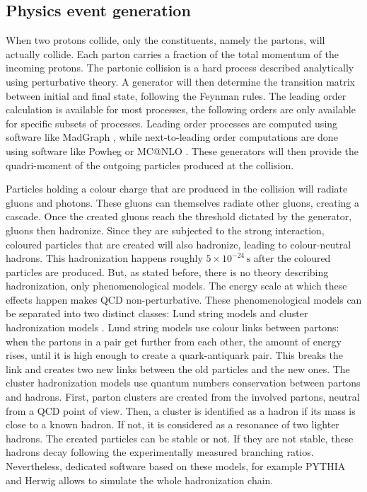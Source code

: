 \subsection{Physics event generation} 
\label{sec:cms_physics_event_generation}

When two protons collide, only the constituents, namely the partons, will actually collide. Each parton carries a fraction of the total momentum of the incoming protons. The partonic collision is a hard process described analytically using perturbative theory. A generator will then determine the transition matrix between initial and final state, following the Feynman rules. The leading order calculation is available for most processes, the following orders are only available for specific subsets of processes. Leading order processes are computed using software like MadGraph \cite{Alwall2011}, while next-to-leading order computations are done using software like Powheg \cite{Alioli2010} or MC@NLO \cite{Frixione_2002}.
These generators will then provide the quadri-moment of the outgoing particles produced at the collision.

Particles holding a colour charge that are produced in the collision will radiate gluons and photons. These gluons can themselves radiate other gluons, creating a cascade. Once the created gluons reach the threshold dictated by the generator, gluons then hadronize. Since they are subjected to the strong interaction, coloured particles that are created will also hadronize, leading to colour-neutral hadrons. This hadronization happens roughly $5 \times 10^{-24}\,\mathrm{s}$ after the coloured particles are produced. But, as stated before, there is no theory describing hadronization, only phenomenological models. The energy scale at which these effects happen makes QCD non-perturbative. These phenomenological models can be separated into two distinct classes: Lund string models \cite{1983PhR....97...31A} and cluster hadronization models \cite{Winter2004}. Lund string models use colour links between partons: when the partons in a pair get further from each other, the amount of energy rises, until it is high enough to create a quark-antiquark pair. This breaks the link and creates two new links between the old particles and the new ones. The cluster hadronization models use quantum numbers conservation between partons and hadrons. First, parton clusters are created from the involved partons, neutral from a QCD point of view. Then, a cluster is identified as a hadron if its mass is close to a known hadron. If not, it is considered as a resonance of two lighter hadrons. The created particles can be stable or not. If they are not stable, these hadrons decay following the experimentally measured branching ratios. Nevertheless, dedicated software based on these models, for example PYTHIA \cite{SJOSTRAND2008852} and Herwig \cite{Bellm2016} allows to simulate the whole hadronization chain.

